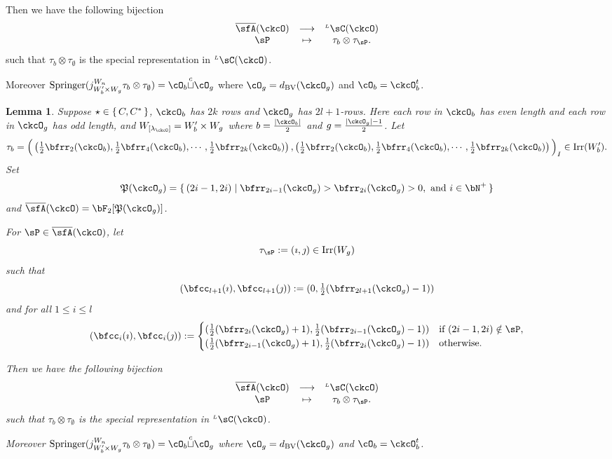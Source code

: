 \documentclass[12pt,a4paper]{amsart}
\def\abs#1{\left|{#1}\right|}
\newcommand{\CQ}{{\mathcal {Q}}}
\numberwithin{equation}{section}
\newtheorem{lem}[thm]{Lemma}
\theoremstyle{remark}
\def\half{{\tfrac{1}{2}}}
\def\Irr{\mathrm{Irr}}
\def\dBV{d_{\mathrm{BV}}}
\def\WLamck{W_{[\lambda_{\ckcO}]}}
\def\LC{{}^{\scriptscriptstyle L}\sC}
\def\cupcol{{\stackrel{c}{\sqcup}}}
\def\Spr{\mathrm{Springer}}
\def\CQ{\overline{\sfA}}%
\def\CPP{\mathfrak{P}}
\begin{document}
  Then we have the following bijection
  \[
    \begin{array}{ccc}
      \CQ(\ckcO) &\longrightarrow & \LC(\ckcO)\\
      \sP & \mapsto & \tau_{b}\otimes \tau_{\sP}.
    \end{array}
  \]
  such that $\tau_{b}\otimes \tau_{\emptyset}$ is the special representation in
  $\LC(\ckcO)$.

  Moreover
  $\Spr(j_{W'_{b}\times W_{g}}^{W_{n}} \tau_{b}\otimes \tau_{\emptyset}) = \cO_{b}\cupcol \cO_{g}$
  where $\cO_{g} = \dBV(\ckcO_{g})$ and $\cO_{b} = \ckcO_{b}^{t}$.


\begin{lem}\label{lem:cell.C}
  Suppose $\star \in \set{C, C^{*}}$, $\ckcO_{b}$ has $2k$ rows and $\ckcO_{g}$
  has $2l+1$-rows. Here each row in $\ckcO_{b}$ has even length and each row in
  $\ckcO_{g}$ has odd length, and $\WLamck = W'_{b}\times W_{g}$ where
  $b= \frac{\abs{\ckcO_{b}}}{2}$ and $g = \frac{\abs{\ckcO_{g}}-1}{2}$. Let
  \[
    \tau_{b} = \Big( \left(\half\bfrr_{2}(\ckcO_{b}), \half\bfrr_{4}(\ckcO_{b}),\cdots, \half\bfrr_{2k}(\ckcO_{b})\right), \left(\half\bfrr_{2}(\ckcO_{b}), \half\bfrr_{4}(\ckcO_{b}),\cdots, \half\bfrr_{2k}(\ckcO_{b}) \right)\Big)_{I} \in \Irr(W'_{b}).
  \]
  Set
  \[
    \CPP(\ckcO_{g}) = \set{(2i-1,2i)| \bfrr_{2i-1}(\ckcO_{g})> \bfrr_{2i}(\ckcO_{g})>0, \text{
        and } i\in \bN^{+}}
  \]
  and $\CQ(\ckcO)= \bF_{2}[\CPP(\ckcO_{g})]$.

  For $\sP \in \CQ(\ckcO)$, let
  \[
    \tau_{\sP} := (\imath,\jmath) \in \Irr(W_{g})
  \]
  such that
  \[
    (\bfcc_{l+1}(\imath), \bfcc_{l+1}(\jmath)) := (0,\half(\bfrr_{2l+1}(\ckcO_{g})-1))
  \]
  and for all $1\leq i\leq l$
  \[
    (\bfcc_{i}(\imath), \bfcc_{i}(\jmath)):=
    \begin{cases}
      (\half (\bfrr_{2i}(\ckcO_{g})+1), \half (\bfrr_{2i-1}(\ckcO_{g})-1))
      & \text{if } (2i-1,2i)\notin \sP,\\
      (\half (\bfrr_{2i-1}(\ckcO_{g})+1),\half (\bfrr_{2i}(\ckcO_{g})-1)) & \text{otherwise.}
    \end{cases}
  \]

  Then we have the following bijection
  \[
    \begin{array}{ccc}
      \CQ(\ckcO) &\longrightarrow & \LC(\ckcO)\\
      \sP & \mapsto & \tau_{b}\otimes \tau_{\sP}.
    \end{array}
  \]
  such that $\tau_{b}\otimes \tau_{\emptyset}$ is the special representation in
  $\LC(\ckcO)$.

  Moreover
  $\Spr(j_{W'_{b}\times W_{g}}^{W_{n}} \tau_{b}\otimes \tau_{\emptyset}) = \cO_{b}\cupcol \cO_{g}$
  where $\cO_{g} = \dBV(\ckcO_{g})$ and $\cO_{b} = \ckcO_{b}^{t}$.
\end{lem}
\end{document}
